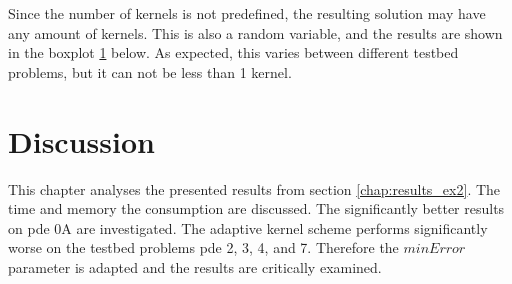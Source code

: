 \documentclass[./\jobname.tex]{subfiles}
\begin{document}
Since the number of kernels is not predefined, the resulting solution may have any amount of kernels. This is also a random variable, and the results are shown in the boxplot \ref{fig:pajade_kernels_boxplot} below. As expected, this varies between different testbed problems, but it can not be less than 1 kernel. 

\begin{figure}[H]
	\centering
	\noindent{}
	\label{fig:pajade_kernels_boxplot}
\end{figure}


\section{Discussion}

This chapter analyses the presented results from section \ref{chap:results_ex2}. The time and memory the consumption are discussed. The significantly better results on \gls{pde} 0A are investigated. The adaptive kernel scheme performs significantly worse on the testbed problems \gls{pde} 2, 3, 4, and 7. Therefore the $minError$ parameter is adapted and the results are critically examined. 
\end{document}
